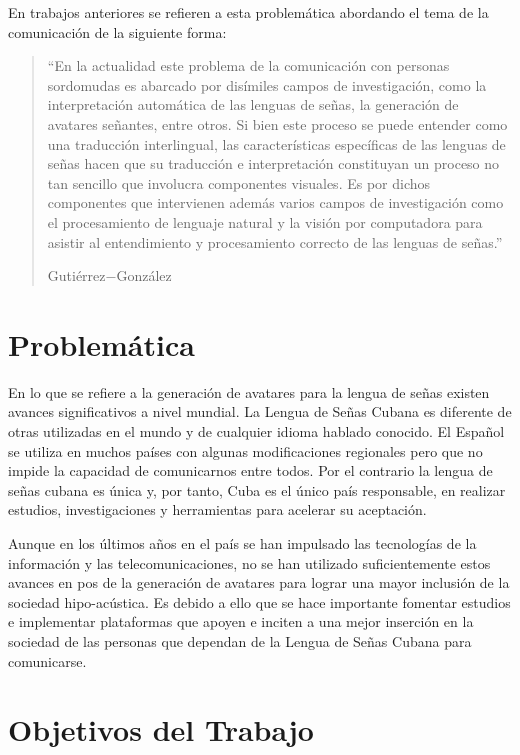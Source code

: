 En trabajos anteriores se refieren a esta problemática abordando el tema de la comunicación de la siguiente forma:

\begin{quote}


 ``En la actualidad este problema de la comunicación con personas sordomudas es abarcado por disímiles campos de investigación, como la interpretación automática de las lenguas de señas, la generación de avatares señantes, entre otros. Si bien este proceso se puede entender como una traducción interlingual, las características  específicas de las lenguas de señas hacen que su traducción e interpretación constituyan un proceso no tan sencillo que involucra componentes visuales. Es por dichos componentes que intervienen además varios campos de investigación como el procesamiento de lenguaje natural y la visión por computadora para asistir al entendimiento y procesamiento correcto de las lenguas de señas.''
\begin{flushright}
Gutiérrez$-$González
\end{flushright}
\end{quote}

\section*{Problemática}

En lo que se refiere a la generación de avatares para la lengua de señas existen avances 
significativos a nivel mundial. La Lengua de Señas Cubana es diferente de otras utilizadas en el mundo y de cualquier idioma hablado conocido. El Español se 
utiliza en muchos países con algunas modificaciones regionales pero que no impide la capacidad de comunicarnos entre todos. Por el contrario la lengua de señas cubana es única y, por tanto, Cuba es el único país responsable, en realizar estudios, investigaciones y herramientas para 
acelerar su aceptación.

Aunque en los últimos años en el país se han impulsado las tecnologías de la información y las 
telecomunicaciones, no se han utilizado suficientemente estos avances en pos de la generación de avatares para lograr 
una mayor inclusión de la sociedad hipo-acústica. Es debido a ello que se hace importante
fomentar estudios e implementar plataformas que apoyen e inciten a una mejor inserción
en la sociedad de las personas que dependan de la Lengua de Señas Cubana para
comunicarse.

\section*{Objetivos del Trabajo}

